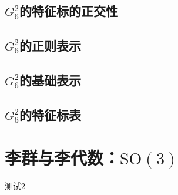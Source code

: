 \documentclass[UTF8]{ctexart}
\begin{document}
\subsection{$G_6^2$的特征标的正交性}

\subsection{$G_6^2$的正则表示}

\subsection{$G_6^2$的基础表示}

\subsection{$G_6^2$的特征标表}

\section{李群与李代数：$\mathrm{SO}(3)$}
测试2
\end{document}
